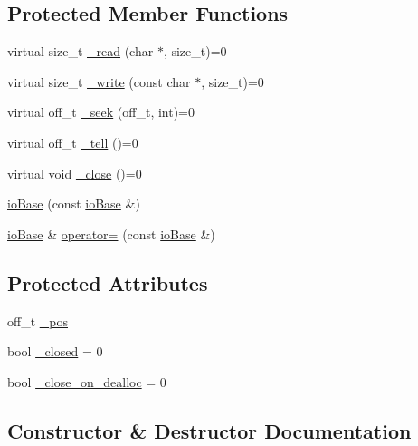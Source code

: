 \subsection*{Protected Member Functions}
\begin{DoxyCompactItemize}
\item 
virtual size\+\_\+t \mbox{\hyperlink{classebml_1_1ioBase_a00c5ba612f103ea06243d92f2410bc14}{\+\_\+read}} (char $\ast$, size\+\_\+t)=0
\item 
virtual size\+\_\+t \mbox{\hyperlink{classebml_1_1ioBase_a908cb3c7e36e440be2b3019e9e09a780}{\+\_\+write}} (const char $\ast$, size\+\_\+t)=0
\item 
virtual off\+\_\+t \mbox{\hyperlink{classebml_1_1ioBase_add69b836450d14e75580cec66ac04229}{\+\_\+seek}} (off\+\_\+t, int)=0
\item 
virtual off\+\_\+t \mbox{\hyperlink{classebml_1_1ioBase_a7cdde34fd8a6bb1968130e6e4cf74bc2}{\+\_\+tell}} ()=0
\item 
virtual void \mbox{\hyperlink{classebml_1_1ioBase_aaf78807501111b7351eb3ffaaeb3d9b8}{\+\_\+close}} ()=0
\item 
\mbox{\hyperlink{classebml_1_1ioBase_a51bc16ce542fdba5afca9ed711e89075}{io\+Base}} (const \mbox{\hyperlink{classebml_1_1ioBase}{io\+Base}} \&)
\item 
\mbox{\hyperlink{classebml_1_1ioBase}{io\+Base}} \& \mbox{\hyperlink{classebml_1_1ioBase_acdce9702e9511b87d0bea6b73b2fda5e}{operator=}} (const \mbox{\hyperlink{classebml_1_1ioBase}{io\+Base}} \&)
\end{DoxyCompactItemize}
\subsection*{Protected Attributes}
\begin{DoxyCompactItemize}
\item 
off\+\_\+t \mbox{\hyperlink{classebml_1_1ioBase_ada889242b80f658e0a80a465bf2bd9f7}{\+\_\+pos}}
\item 
bool \mbox{\hyperlink{classebml_1_1ioBase_ab87e105b03270d59019c05e7451b51d3}{\+\_\+closed}} = 0
\item 
bool \mbox{\hyperlink{classebml_1_1ioBase_a0083c31349d480a5e3b83dd366c22144}{\+\_\+close\+\_\+on\+\_\+dealloc}} = 0
\end{DoxyCompactItemize}


\subsection{Constructor \& Destructor Documentation}
\mbox{\label{classebml_1_1ioBase_af0d31f731961fad7d3db80ba51a44ad1}} 
